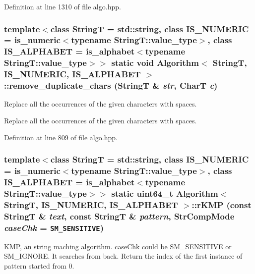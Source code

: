 Definition at line 1310 of file algo.hpp.\hypertarget{classAlgorithm_114fe02302e735017ae2277a1b173e96}{
\subsubsection[{remove\_\-duplicate\_\-chars}]{\setlength{\rightskip}{0pt plus 5cm}template$<$class StringT  = std::string, class IS\_\-NUMERIC  = is\_\-numeric$<$typename StringT::value\_\-type$>$, class IS\_\-ALPHABET  = is\_\-alphabet$<$typename StringT::value\_\-type$>$$>$ static void {\bf Algorithm}$<$ StringT, IS\_\-NUMERIC, IS\_\-ALPHABET $>$::remove\_\-duplicate\_\-chars (StringT \& {\em str}, \/  CharT {\em c})}}
\label{classAlgorithm_114fe02302e735017ae2277a1b173e96}


Replace all the occurrences of the given characters with spaces. 

Replace all the occurrences of the given characters with spaces. 

Definition at line 809 of file algo.hpp.\hypertarget{classAlgorithm_a3e24e19980c0dd29c80f9feff6e5191}{
\subsubsection[{rKMP}]{\setlength{\rightskip}{0pt plus 5cm}template$<$class StringT  = std::string, class IS\_\-NUMERIC  = is\_\-numeric$<$typename StringT::value\_\-type$>$, class IS\_\-ALPHABET  = is\_\-alphabet$<$typename StringT::value\_\-type$>$$>$ static uint64\_\-t {\bf Algorithm}$<$ StringT, IS\_\-NUMERIC, IS\_\-ALPHABET $>$::rKMP (const StringT \& {\em text}, \/  const StringT \& {\em pattern}, \/  StrCompMode {\em caseChk} = {\tt SM\_\-SENSITIVE})}}
\label{classAlgorithm_a3e24e19980c0dd29c80f9feff6e5191}


KMP, an string maching algorithm. caseChk could be SM\_\-SENSITIVE or SM\_\-IGNORE. It searches from back. Return the index of the first instance of pattern started from 0. 

